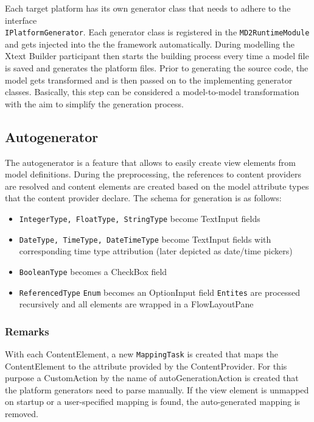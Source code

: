 

Each target platform has its own generator class that needs to adhere to the interface \\ \lstinline|IPlatformGenerator|. Each generator class is registered in the \lstinline|MD2RuntimeModule| and gets injected into the the framework automatically. During modelling the Xtext Builder participant then starts the building process every time a model file is saved and generates the platform files.
Prior to generating the source code, the model gets transformed and is then passed on to the implementing generator classes. Basically, this step can be considered a model-to-model transformation with the aim to simplify the generation process.

\subsection{Autogenerator}
The autogenerator is a feature that allows to easily create view elements from model definitions. During the preprocessing, the references to content providers are resolved and content elements are created based on the model attribute types that the content provider declare. The schema for generation is as follows:

\begin{itemize}
	\item \lstinline!IntegerType, FloatType, StringType! become TextInput fields
	\item \lstinline!DateType, TimeType, DateTimeType! become TextInput fields with corresponding time type attribution (later depicted as date/time pickers)
	\item \lstinline!BooleanType! becomes a CheckBox field
	\item \lstinline!ReferencedType!
		\subitem \lstinline!Enum! becomes an OptionInput field
		\subitem \lstinline!Entites! are processed recursively and all elements are wrapped in a FlowLayoutPane
\end{itemize}

\subsubsection{Remarks}
With each ContentElement, a new \lstinline!MappingTask! is created that maps the ContentElement to the attribute provided by the ContentProvider. For this purpose a CustomAction by the name of autoGenerationAction is created that the platform generators need to parse manually. If the view element is unmapped on startup or a user-specified mapping is found, the auto-generated mapping is removed.

